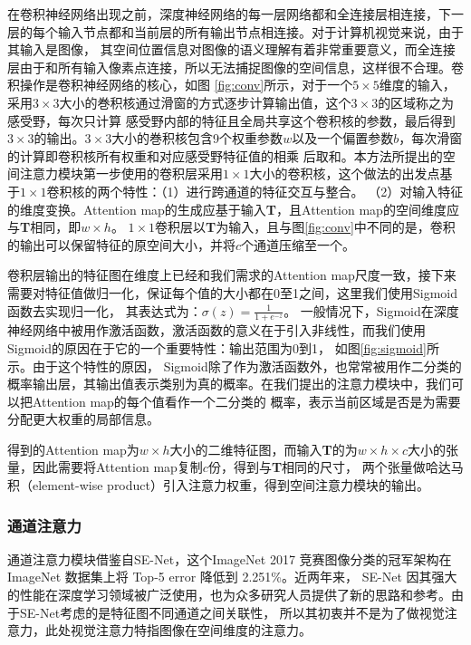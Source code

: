 
在卷积神经网络出现之前，深度神经网络的每一层网络都和全连接层相连接，下一层的每个输入节点都和当前层的所有输出节点相连接。对于计算机视觉来说，由于其输入是图像，
其空间位置信息对图像的语义理解有着非常重要意义，而全连接层由于和所有输入像素点连接，所以无法捕捉图像的空间信息，这样很不合理。卷积操作是卷积神经网络的核心，如图
\ref{fig:conv}所示，对于一个$5 \times 5$维度的输入，采用$3 \times 3$大小的巻积核通过滑窗的方式逐步计算输出值，这个$3 \times 3$的区域称之为感受野，每次只计算
感受野内部的特征且全局共享这个卷积核的参数，最后得到$3 \times 3$的输出。$3 \times 3$大小的巻积核包含9个权重参数$w$以及一个偏置参数$b$，每次滑窗的计算即卷积核所有权重和对应感受野特征值的相乘
后取和。本方法所提出的空间注意力模块第一步使用的卷积层采用$1 \times 1$大小的卷积核，这个做法的出发点基于$1 \times 1$卷积核的两个特性：（1）进行跨通道的特征交互与整合。
（2）对输入特征的维度变换。Attention map的生成应基于输入\textbf{T}，且Attention map的空间维度应与\textbf{T}相同，即$w\times h$。
$1 \times 1$卷积层以\textbf{T}为输入，且与图\ref{fig:conv}中不同的是，卷积的输出可以保留特征的原空间大小，并将$c$个通道压缩至一个。

卷积层输出的特征图在维度上已经和我们需求的Attention map尺度一致，接下来需要对特征值做归一化，保证每个值的大小都在0至1之间，这里我们使用Sigmoid函数去实现归一化，
其表达式为：$\sigma(z)=\frac{1}{1+e^{-z}}$。
一般情况下，Sigmoid在深度神经网络中被用作激活函数，激活函数的意义在于引入非线性，而我们使用Sigmoid的原因在于它的一个重要特性：输出范围为0到1，
如图\ref{fig:sigmoid}所示。由于这个特性的原因，
Sigmoid除了作为激活函数外，也常常被用作二分类的概率输出层，其输出值表示类别为真的概率。在我们提出的注意力模块中，我们可以把Attention map的每个值看作一个二分类的
概率，表示当前区域是否是为需要分配更大权重的局部信息。


得到的Attention map为$w\times h$大小的二维特征图，而输入\textbf{T}的为$w\times h \times c$大小的张量，因此需要将Attention map复制$c$份，得到与\textbf{T}相同的尺寸，
两个张量做哈达马积（element-wise product）引入注意力权重，得到空间注意力模块的输出。

\subsubsection{通道注意力}
通道注意力模块借鉴自SE-Net，这个ImageNet 2017 竞赛图像分类的冠军架构在ImageNet 数据集上将 Top-5 error 降低到 2.251\%。近两年来，
SE-Net 因其强大的性能在深度学习领域被广泛使用，也为众多研究人员提供了新的思路和参考。由于SE-Net考虑的是特征图不同通道之间关联性，
所以其初衷并不是为了做视觉注意力，此处视觉注意力特指图像在空间维度的注意力。

